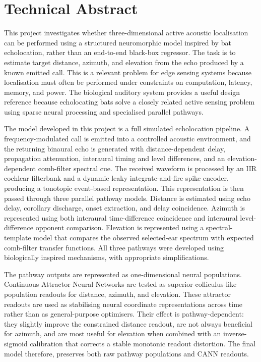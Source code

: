 \chapter*{Technical Abstract}

This project investigates whether three-dimensional active acoustic localisation can be performed using a structured neuromorphic model inspired by bat echolocation, rather than an end-to-end black-box regressor. The task is to estimate target distance, azimuth, and elevation from the echo produced by a known emitted call. This is a relevant problem for edge sensing systems because localisation must often be performed under constraints on computation, latency, memory, and power. The biological auditory system provides a useful design reference because echolocating bats solve a closely related active sensing problem using sparse neural processing and specialised parallel pathways.

The model developed in this project is a full simulated echolocation pipeline. A frequency-modulated call is emitted into a controlled acoustic environment, and the returning binaural echo is generated with distance-dependent delay, propagation attenuation, interaural timing and level differences, and an elevation-dependent comb-filter spectral cue. The received waveform is processed by an IIR cochlear filterbank and a dynamic leaky integrate-and-fire spike encoder, producing a tonotopic event-based representation. This representation is then passed through three parallel pathway models. Distance is estimated using echo delay, corollary discharge, onset extraction, and delay coincidence. Azimuth is represented using both interaural time-difference coincidence and interaural level-difference opponent comparison. Elevation is represented using a spectral-template model that compares the observed selected-ear spectrum with expected comb-filter transfer functions. All three pathways were developed using biologically inspired mechanisms, with appropriate simplifications.

The pathway outputs are represented as one-dimensional neural populations. Continuous Attractor Neural Networks are tested as superior-colliculus-like population readouts for distance, azimuth, and elevation. These attractor readouts are used as stabilising neural coordinate representations across time rather than as general-purpose optimisers. Their effect is pathway-dependent: they slightly improve the constrained distance readout, are not always beneficial for azimuth, and are most useful for elevation when combined with an inverse-sigmoid calibration that corrects a stable monotonic readout distortion. The final model therefore, preserves both raw pathway populations and CANN readouts.

